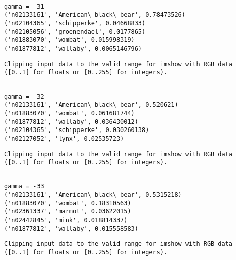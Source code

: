 \documentclass[11pt]{article}
\begin{document}
    \begin{Verbatim}[commandchars=\\\{\}]

gamma = -31
('n02133161', 'American\_black\_bear', 0.78473526)
('n02104365', 'schipperke', 0.04668833)
('n02105056', 'groenendael', 0.0177865)
('n01883070', 'wombat', 0.015998319)
('n01877812', 'wallaby', 0.0065146796)

    \end{Verbatim}

    \begin{Verbatim}[commandchars=\\\{\}]
Clipping input data to the valid range for imshow with RGB data ([0..1] for floats or [0..255] for integers).

    \end{Verbatim}

    \begin{Verbatim}[commandchars=\\\{\}]

gamma = -32
('n02133161', 'American\_black\_bear', 0.520621)
('n01883070', 'wombat', 0.061681744)
('n01877812', 'wallaby', 0.036430012)
('n02104365', 'schipperke', 0.030260138)
('n02127052', 'lynx', 0.02535723)

    \end{Verbatim}

    \begin{Verbatim}[commandchars=\\\{\}]
Clipping input data to the valid range for imshow with RGB data ([0..1] for floats or [0..255] for integers).

    \end{Verbatim}

    \begin{Verbatim}[commandchars=\\\{\}]

gamma = -33
('n02133161', 'American\_black\_bear', 0.5315218)
('n01883070', 'wombat', 0.18310563)
('n02361337', 'marmot', 0.03622015)
('n02442845', 'mink', 0.018814337)
('n01877812', 'wallaby', 0.015558583)

    \end{Verbatim}

    \begin{Verbatim}[commandchars=\\\{\}]
Clipping input data to the valid range for imshow with RGB data ([0..1] for floats or [0..255] for integers).

    \end{Verbatim}
\end{document}
